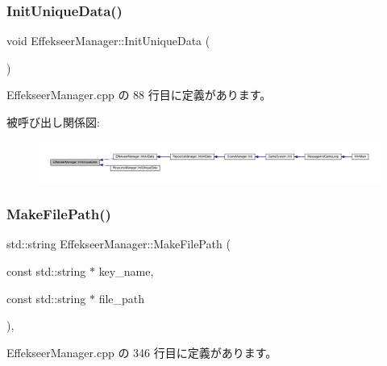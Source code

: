 \subsubsection{\texorpdfstring{Init\+Unique\+Data()}{InitUniqueData()}}
{\footnotesize\ttfamily void Effekseer\+Manager\+::\+Init\+Unique\+Data (\begin{DoxyParamCaption}{ }\end{DoxyParamCaption})\hspace{0.3cm}{\ttfamily [static]}}



 Effekseer\+Manager.\+cpp の 88 行目に定義があります。

被呼び出し関係図\+:
\nopagebreak
\begin{figure}[H]
\begin{center}
\leavevmode
\includegraphics[width=350pt]{class_effekseer_manager_a95d9d2eda8cb691c2565d022198b5787_icgraph}
\end{center}
\end{figure}
\mbox{\label{class_effekseer_manager_ad6c9359de20c955af42a72c145571168}} 
\subsubsection{\texorpdfstring{Make\+File\+Path()}{MakeFilePath()}}
{\footnotesize\ttfamily std\+::string Effekseer\+Manager\+::\+Make\+File\+Path (\begin{DoxyParamCaption}\item[{const std\+::string $\ast$}]{key\+\_\+name,  }\item[{const std\+::string $\ast$}]{file\+\_\+path }\end{DoxyParamCaption})\hspace{0.3cm}{\ttfamily [static]}, {\ttfamily [private]}}



 Effekseer\+Manager.\+cpp の 346 行目に定義があります。

